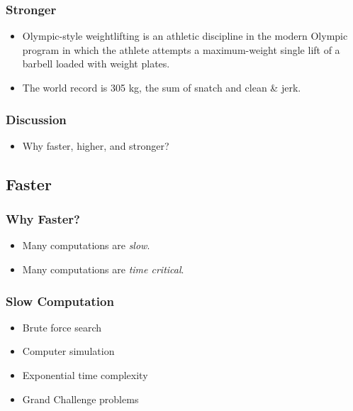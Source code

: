 \documentclass{beamer}
\begin{document}
\begin{CJK}{UTF8}{bsmi}
\begin{frame}
\frametitle{Stronger}
\begin{itemize}
\item Olympic-style weightlifting is an athletic discipline in the modern Olympic program in which the athlete attempts a maximum-weight single lift of a barbell loaded with weight plates.
\item The world record is 305 kg, the sum of snatch and clean \& jerk. 
\end{itemize}
\end{frame}

\begin{frame}
\frametitle{Discussion}
\Large 
\begin{itemize}
\item Why faster, higher, and stronger?
\end{itemize}
\end{frame}


\subsection{Faster}

\begin{frame}
\frametitle{Why Faster?}
\begin{itemize}
\item Many computations are {\em slow}.
\item Many computations are {\em time critical}.
\end{itemize}
\end{frame}

\begin{frame}
\frametitle{Slow Computation}
\begin{itemize}
\item Brute force search
\item Computer simulation
\item Exponential time complexity
\item Grand Challenge problems
\end{itemize}
\end{frame}


\end{CJK}
\end{document}
